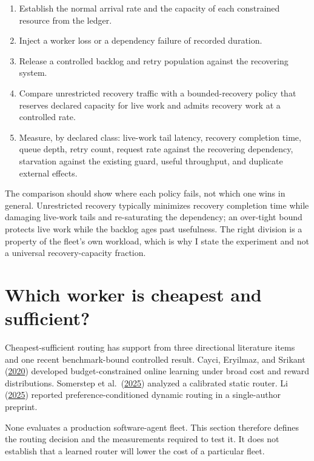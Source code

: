 \begin{enumerate}
\def\labelenumi{\arabic{enumi}.}
\tightlist
\item
  Establish the normal arrival rate and the capacity of each constrained resource from the ledger.
\item
  Inject a worker loss or a dependency failure of recorded duration.
\item
  Release a controlled backlog and retry population against the recovering system.
\item
  Compare unrestricted recovery traffic with a bounded-recovery policy that reserves declared capacity for live work and admits recovery work at a controlled rate.
\item
  Measure, by declared class: live-work tail latency, recovery completion time, queue depth, retry count, request rate against the recovering dependency, starvation against the existing guard, useful throughput, and duplicate external effects.
\end{enumerate}

The comparison should show where each policy fails, not which one wins in general. Unrestricted recovery typically minimizes recovery completion time while damaging live-work tails and re-saturating the dependency; an over-tight bound protects live work while the backlog ages past usefulness. The right division is a property of the fleet's own workload, which is why I state the experiment and not a universal recovery-capacity fraction.

\hypertarget{which-worker-is-cheapest-and-sufficient}{%
\section{Which worker is cheapest and sufficient?}\label{which-worker-is-cheapest-and-sufficient}}

Cheapest-sufficient routing has support from three directional literature items and one recent benchmark-bound controlled result. Cayci, Eryilmaz, and Srikant (\href{https://arxiv.org/abs/2003.00365}{2020}) developed budget-constrained online learning under broad cost and reward distributions. Somerstep et al.~(\href{https://arxiv.org/abs/2502.03261}{2025}) analyzed a calibrated static router. Li (\href{https://arxiv.org/abs/2502.02743}{2025}) reported preference-conditioned dynamic routing in a single-author preprint.

None evaluates a production software-agent fleet. This section therefore defines the routing decision and the measurements required to test it. It does not establish that a learned router will lower the cost of a particular fleet.

